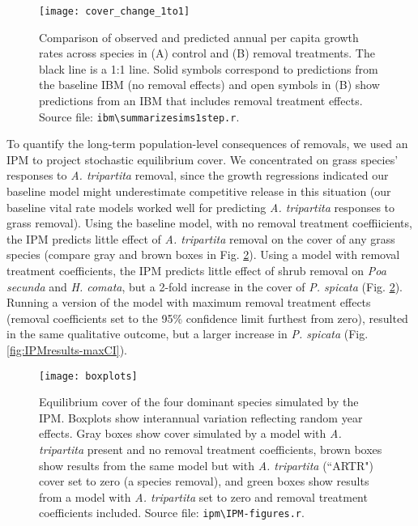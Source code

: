 \documentclass[11pt]{article}
\begin{document}
\begin{doublespacing}
  \begin{figure}[tbp]
  \centering
  \texttt{[image: cover\_change\_1to1]}
  \caption{Comparison of observed and predicted annual per capita growth rates across species in (A) control and (B) removal treatments. The black line is a 1:1 line. Solid symbols correspond to predictions from the baseline IBM (no removal effects) and open symbols in (B) show predictions from an IBM that includes removal treatment effects. Source file: \texttt{ibm\textbackslash summarize\textunderscore sims1step.r}. }
  \label{fig:ObsPred1to1}
  \end{figure}

To quantify the long-term population-level consequences of removals, we used an IPM to project stochastic equilibrium cover. We concentrated on grass species' responses to \textit{A. tripartita} removal, since the growth regressions indicated our baseline model might underestimate competitive release in this situation (our baseline vital rate models worked well for predicting \textit{A. tripartita} responses to grass removal). Using the baseline model, with no removal treatment coeffiicients, the IPM predicts little effect of \textit{A. tripartita} removal on the cover of any grass species (compare gray and brown boxes in Fig. \ref{fig:IPMresults}). Using a model with removal treatment coefficients, the IPM predicts little effect of shrub removal on \textit{Poa secunda} and \textit{H. comata}, but a 2-fold increase in the cover of \textit{P. spicata} (Fig. \ref{fig:IPMresults}). Running a version of the model with maximum removal treatment effects (removal coefficients set to the 95\% confidence limit furthest from zero), resulted in the same qualitative outcome, but a larger increase in \textit{P. spicata} (Fig. \ref{fig:IPMresults-maxCI}). 

 \begin{figure}[tbp]
 \centering
 \texttt{[image: boxplots]}
 \caption{Equilibrium cover of the four dominant species simulated by the IPM. Boxplots show interannual variation reflecting random year effects. Gray boxes show cover simulated by a model with \textit{A. tripartita} present and no removal treatment coefficients, brown boxes show results from the same model but with \textit{A. tripartita} (``ARTR") cover set to zero (a species removal), and green boxes show results from a model with  \textit{A. tripartita} set to zero and removal treatment coefficients included. Source file: \texttt{ipm\textbackslash IPM-figures.r}.}
 \label{fig:IPMresults}
 \end{figure}
 

\end{doublespacing}
\end{document}
